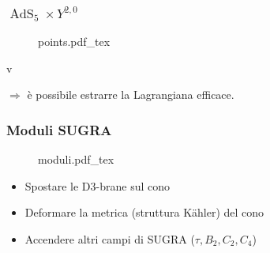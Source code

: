 \documentclass[aspectratio=43,mathserif]{beamer}
\newcommand{\ads}{\ensuremath{\operatorname{AdS}}}
\begin{document}
\begin{frame}
	\frametitle{$ \ads_5 \times Y^{2,0} $}

	\vspace{-20pt}
	\begin{figure}[h!]\centering
		\def\svgscale{0.5}
		{points.pdf_tex}
	\end{figure}


	\vspace{-30pt}
	
	\vfill

	\begin{center}
		v	
		
	\end{center}

	\vfill $\Rightarrow$ è possibile estrarre la Lagrangiana efficace.

\end{frame}

\begin{frame}
	\frametitle{Moduli SUGRA}
	\vspace{-5pt}
	\begin{figure}[h!]\centering
		\def\svgscale{0.3}
		{moduli.pdf_tex}
	\end{figure}
	\vspace{-10pt}
	\begin{itemize}
		\item Spostare le D3-brane sul cono 
		\item Deformare la metrica (struttura K\"ahler) del cono
		\item Accendere altri campi di SUGRA ($\tau,B_2,C_2,C_4$)
	\end{itemize}
\end{frame}
\end{document}

